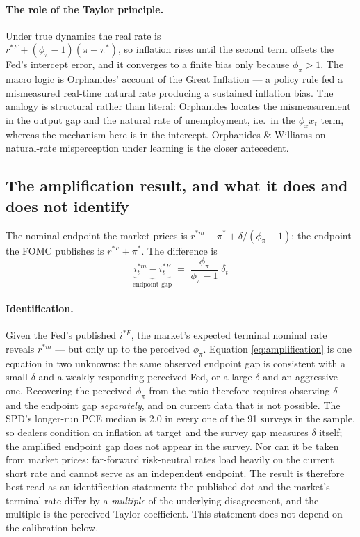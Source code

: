 \documentclass[11pt]{article}
\begin{document}
\paragraph{The role of the Taylor principle.} Under true dynamics the real rate is\\
$r^{*F}+(\phi_\pi-1)(\pi-\pi^{*})$, so inflation rises until the second term offsets the Fed's
intercept error, and it converges to a finite bias only because $\phi_\pi>1$.
The macro logic is Orphanides' account of the Great Inflation --- a policy rule fed a mismeasured
real-time natural rate producing a sustained inflation bias. The analogy is structural rather
than literal: Orphanides locates the mismeasurement in the output gap and the natural rate of
unemployment, i.e.\ in the $\phi_x x_t$ term, whereas the mechanism here is in the intercept.
Orphanides \& Williams on natural-rate misperception under learning is the closer antecedent.
\subsection{The amplification result, and what it does and does not identify}
The nominal endpoint the market prices is $r^{*m} + \pi^{*} + \delta/(\phi_\pi-1)$; the endpoint
the FOMC publishes is $r^{*F} + \pi^{*}$. The difference is
\begin{equation}
\boxed{\;\underbrace{i^{*m}_t - i^{*F}_t}_{\text{endpoint gap}} \;=\; \frac{\phi_\pi}{\phi_\pi-1}\;\delta_t\;}
\label{eq:amplification}
\end{equation}
\paragraph{Identification.} Given the Fed's
published $i^{*F}$, the market's expected terminal nominal rate reveals $r^{*m}$ --- but only up
to the perceived $\phi_\pi$. Equation \eqref{eq:amplification} is one equation in two unknowns:
the same observed endpoint gap is consistent with a small $\delta$ and a weakly-responding
perceived Fed, or a large $\delta$ and an aggressive one. Recovering the perceived $\phi_\pi$
from the ratio therefore requires observing $\delta$ and the endpoint gap \emph{separately},
and on current data that is not possible. The SPD's longer-run PCE median is 2.0 in every one
of the 91 surveys in the sample, so dealers condition on inflation at target and the survey gap
measures $\delta$ itself; the amplified endpoint gap does not appear in the survey. Nor can it
be taken from market prices: far-forward risk-neutral rates load heavily on the current short
rate and cannot serve as an independent endpoint. The result is therefore best read as an
identification statement: the published dot and the market's terminal rate differ by a
\emph{multiple} of the underlying disagreement, and the multiple is the perceived Taylor
coefficient. This statement does not depend on the calibration below.
\end{document}
